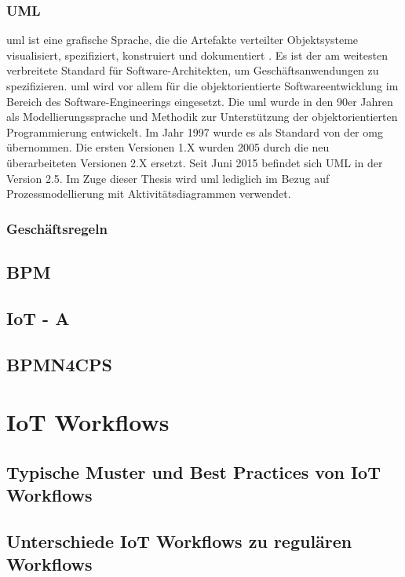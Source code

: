 \documentclass[a4paper, 12pt, twoside, headsepline=true]{scrartcl} %
\begin{document}
\subsubsection{UML}

 \ac{uml} ist eine grafische Sprache, die die Artefakte verteilter Objektsysteme visualisiert, spezifiziert, konstruiert und dokumentiert \cite{Kleuker}. Es ist der am weitesten verbreitete Standard für Software-Architekten, um Geschäftsanwendungen zu spezifizieren. \ac{uml} wird vor allem für die objektorientierte Softwareentwicklung im Bereich des Software-Engineerings eingesetzt.
Die \ac{uml} wurde in den 90er Jahren als Modellierungssprache und Methodik zur Unterstützung der objektorientierten Programmierung entwickelt. Im Jahr 1997 wurde es als Standard von der \ac{omg} übernommen. Die ersten Versionen 1.X wurden 2005 durch die neu überarbeiteten Versionen 2.X ersetzt. Seit Juni 2015 befindet sich UML in der Version 2.5. Im Zuge dieser Thesis wird \ac{uml} lediglich im Bezug auf Prozessmodellierung mit Aktivitätsdiagrammen verwendet. 


\subsubsection{Geschäftsregeln}

\subsection{BPM}

\subsection{IoT - A}

\subsection{BPMN4CPS}

\newpage

\section{IoT Workflows}

\subsection{Typische Muster und Best Practices von IoT Workflows}

\subsection{Unterschiede IoT Workflows zu regulären Workflows}
\end{document}
